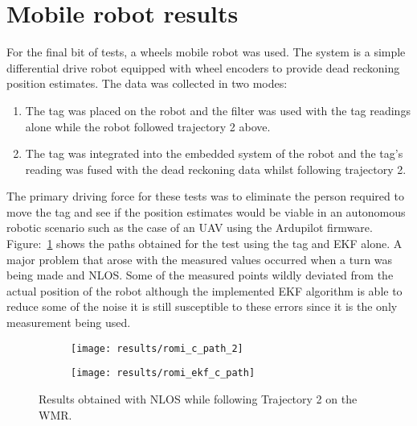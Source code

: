 \section{Mobile robot results}\label{sec:mobile-robot-results}
For the final bit of tests, a wheels mobile robot was used.
The system is a simple differential drive robot equipped with wheel encoders to provide dead reckoning position estimates.
The data was collected in two modes:
\begin{enumerate}
    \item The tag was placed on the robot and the filter was used with the tag readings alone while the robot followed trajectory 2 above.
    \item The tag was integrated into the embedded system of the robot and the tag's reading was fused with the dead reckoning data whilst following trajectory 2.
\end{enumerate}
The primary driving force for these tests was to eliminate the person required to move the tag and see if the position estimates would be viable in an autonomous robotic scenario such as the case of an UAV using the Ardupilot firmware.
Figure:~\ref{fig:romi_nlos_1} shows the paths obtained for the test using the tag and EKF alone.
A major problem that arose with the measured values occurred when a turn was being made and NLOS.
Some of the measured points wildly deviated from the actual position of the robot although the implemented EKF algorithm is able to reduce some of the noise it is still susceptible to these errors since it is the only measurement being used.
\begin{figure}[ht!]
    \centering
    \begin{subfigure}{0.7\textwidth}
            \texttt{[image: results/romi\_c\_path\_2]}
    \end{subfigure}
    \begin{subfigure}{0.7\textwidth}
            \texttt{[image: results/romi\_ekf\_c\_path]}
    \end{subfigure}
    \caption{Results obtained with NLOS while following Trajectory 2 on the WMR.}
    \label{fig:romi_nlos_1}
\end{figure}

